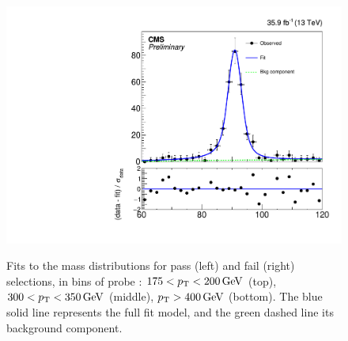 \begin{figure}[htbp]
{    \includegraphics[]{Calibration/Figures/idsf/fit_data_fail_pt_300_350.pdf}
  }
  \caption{
    Fits to the mass distributions for pass (left) and fail (right) selections, in bins of probe \pt: 
    $175 < p_{\mathrm{T}} < 200\,\text{Ge\hspace{-.08em}V}$ (top), 
    $300 < p_{\mathrm{T}} < 350\,\text{Ge\hspace{-.08em}V}$ (middle), 
    $p_{\mathrm{T}} > 400\,\text{Ge\hspace{-.08em}V}$ (bottom). 
    The blue solid line represents the full fit model, and the green dashed line its background component.
  }
  \label{fig:idsf_fits}
\end{figure}

